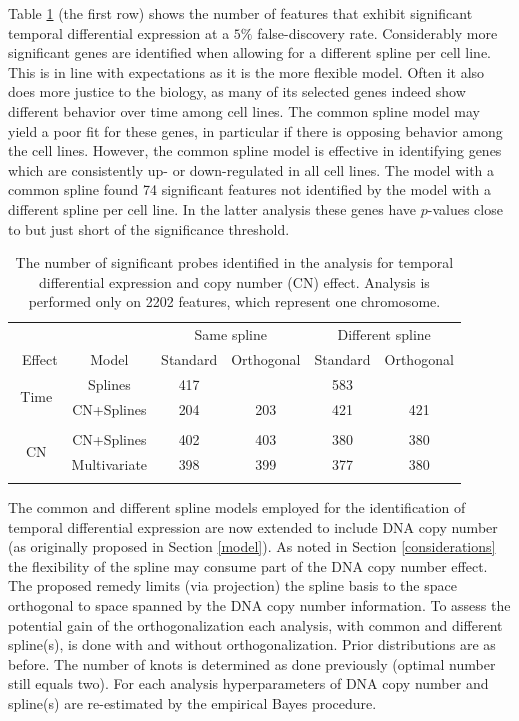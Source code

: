 Table \ref{table:cervicalData} (the first row) shows the number of features that exhibit significant temporal differential expression at a $5\%$ false-discovery rate. Considerably more significant genes are identified when allowing for a different spline per cell line. This is in line with expectations as it is the more flexible model. Often it also does more justice to the biology, as many of its selected genes indeed show different behavior over time among cell lines. The common spline model may yield a poor fit for these genes, in particular if there is opposing behavior among the cell lines. However, the common spline model is effective in identifying genes which are consistently up- or down-regulated in all cell lines. The model with a common spline found 74 significant features not identified by the model with a different spline per cell line. In the latter analysis these genes have $p$-values close to but just short of the significance threshold.
\begin{table}
\centering
\caption{The number of significant probes identified in the analysis for temporal differential expression and copy number (CN) effect. Analysis is performed only on 2202 features, which represent one chromosome.}
\begin{tabular}{cccccc}
  \hline\hline
  {} & {} & \multicolumn{2}{c}{Same spline} & \multicolumn{2}{c}{Different spline}\\\
  {Effect} & {Model} & Standard & Orthogonal & Standard & Orthogonal \\
  \hline
   \multirow{2}{*}{Time} & {Splines} & {417}   & {}  & {583}  & {}    \\
    & {CN+Splines} & {204}   & {203}  & {421}  & {421}    \\
   \\
   \multirow{2}{*}{CN} & {CN+Splines} & {402}  & {403}  &  {380}   & {380}  \\
    & {Multivariate} & {398}  & {399}  &  {377}   & {380}  \\
   \\
   \hline\hline
\end{tabular}
\label{table:cervicalData}
\end{table}
The common and different spline models employed for the identification of temporal differential expression are now extended to include DNA copy number (as originally proposed in Section \ref{model}). As noted in Section \ref{considerations} the flexibility of the spline may consume part of the DNA copy number effect. The proposed remedy limits (via projection) the spline basis to the space orthogonal to space spanned by the DNA copy number information. To assess the potential gain of the orthogonalization each analysis, with common and different spline(s), is done with and without orthogonalization. Prior distributions are as before. The number of knots is determined as done previously (optimal number still equals two). For each analysis hyperparameters of DNA copy number and spline(s) are re-estimated by the empirical Bayes procedure.

